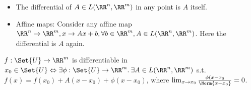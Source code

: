 \begin{exam}
 \begin{itemize}\ 
  \item The differential of $A\in L(\RR^n,\RR^m)$ in any point is $A$ itself.
  \item Affine maps: Consider any affine map $\RR^n\to\RR^m, x\to A x+b, \forall b\in\RR^m, A\in L(\RR^n, \RR^m)$. Here the differential is $A$ again. 
 \end{itemize}
\end{exam}
\begin{prop}
 $f:\Set{U}\to\RR^m$ is differentiable in $x_0\in\Set{U}\Leftrightarrow \exists \phi:\Set{U}\to\RR^m.\:\exists A\in L(\RR^n, \RR^m)$ s.t. $f(x)=f(x_0)+A(x-x_0)+\phi(x-x_0)$, where $\lim_{x\to x_0}\frac{\phi(x-x_0}{\Norm{x-x_0}}=0$. 
\end{prop}